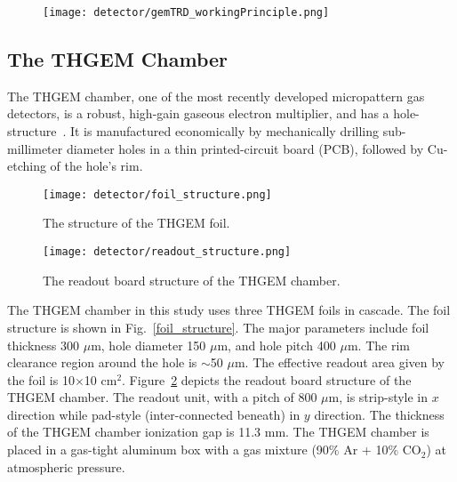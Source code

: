 \begin{figure}[htbp]
\centering
\texttt{[image: detector/gemTRD\_workingPrinciple.png]}
 \label{trd_working_principle}
\end{figure}

\subsection{The THGEM Chamber}
The THGEM chamber, one of the most recently developed micropattern gas detectors, is a robust, high-gain gaseous electron multiplier, and has a hole-structure~\cite{thgem,thgem1}. It is manufactured economically by mechanically drilling sub-millimeter diameter holes in a thin printed-circuit board (PCB), followed by Cu-etching of the hole's rim.

\begin{figure}[htbp]
\begin{minipage}[htbp]{0.68\linewidth}
\centering
\texttt{[image: detector/foil\_structure.png]}
\caption{The structure of the THGEM foil. \label{foil_structure}}
\end{minipage}
\hfill
\begin{minipage}[htbp]{0.3\linewidth}
\centering
\texttt{[image: detector/readout\_structure.png]} 
\caption{The readout board structure of the THGEM chamber.\label{readout_structure}}
\end{minipage}
\end{figure}

The THGEM chamber in this study uses three THGEM foils in cascade. The foil structure is shown in Fig.~\ref{foil_structure}. The major parameters include foil thickness 300 $\mu$m, hole diameter 150 $\mu$m, and hole pitch 400 $\mu$m. The rim clearance region around the hole is $\sim$50 $\mu$m. The effective readout area given by the foil  is 10$\times$10 cm$^{2}$. Figure~\ref{readout_structure} depicts the readout board structure of the THGEM chamber. The readout unit, with a pitch of 800 $\mu$m, is strip-style in $x$ direction while pad-style (inter-connected beneath) in $y$ direction. The thickness of the THGEM chamber ionization gap is 11.3 mm. The THGEM chamber is placed in a gas-tight aluminum box with a gas mixture (90$\%$ Ar + 10$\%$ CO$_{2}$) at atmospheric pressure.

